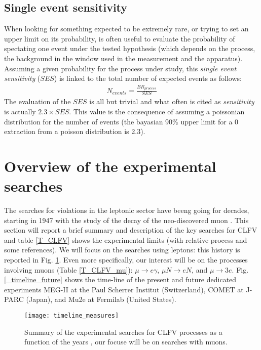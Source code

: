 \documentclass[12pt,a4paper,openright, oneside, titlepage]{book} %
\begin{document}
\subsection{Single event sensitivity}
When looking for something expected to be extremely rare, or trying to set an upper limit on its probability, is often useful to evaluate the probability of spectating one event under the tested hypothesis (which depends on the process, the background in the window used in the measurement and the apparatus). Assuming a given probability for the process under study, this \textit{single event sensitivity} ($SES$) is linked to the total number of expected events as follows:
\begin{align*}
N_{events} = \frac{BR_{process}}{SES}
\end{align*}
The evaluation of the $SES$ is all but trivial and what often is cited as \textit{sensitivity} is actually $2.3\times SES$. This value is the consequence of assuming a poissonian distribution for the number of events (the bayasian 90\% upper limit for a 0 extraction from a poisson distribution is 2.3).\\

\section{Overview of the experimental searches}
The searches for violations in the leptonic sector have beeng going for decades, starting in 1947 \cite{ConvPancPicc} with the study of the decay of the neo-discovered muon \cite{Anderson}.
This section will report a brief summary and description of the key searches for CLFV and table \ref{T_CLFV} shows the experimental limits (with relative process and some references). We will focus on the searches using leptons: this history is reported in  Fig. \ref{timeline_measures}. Even more specifically, our interest will be on the processes involving muons (Table \ref{T_CLFV_mu}): $\mu\rightarrow e\gamma$, $\mu N\rightarrow e N$, and $\mu\rightarrow 3e$.
Fig. \ref{_timeline_future} shows the time-line of the present and future dedicated experiments MEG-II at the Paul Scherrer Institut (Switzerland), COMET at J-PARC (Japan),
and Mu2e at Fermilab (United States).

\begin{figure}[h!]
\centering
\texttt{[image: timeline\_measures]}
\caption{Summary of the experimental searches for CLFV processes as a function of the years \cite{Chiappini}, our focuse will be on searches with muons.}
\label{timeline_measures}
\end{figure}
\end{document}
